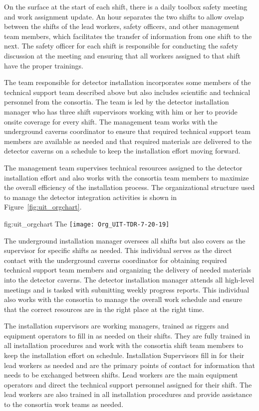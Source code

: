 On the surface at the start of each shift, there is a daily 
toolbox safety meeting and work assignment update. An hour 
separates the two shifts to allow ovelap between the shifts 
of the lead workers, safety officers, and other management 
team members, which facilitates the transfer of information 
from one shift to the next. The safety officer for each shift 
is responsible for conducting the safety discussion at the 
meeting and ensuring that all workers assigned to that shift 
have the proper trainings.

The team responsible for detector installation incorporates 
some members of the technical support team described above 
but also includes scientific and technical personnel from 
the  consortia.  The team is led by the detector 
installation manager who has three shift supervisors working 
with him or her to provide onsite coverage for every shift.
The management team works with the underground caverns 
coordinator to ensure that required technical support team 
members are available as needed and that required materials 
are delivered to the detector caverns on a schedule to keep
the installation effort moving forward.         

The management team supervises technical resources assigned to 
the detector installation effort and also works with the consortia 
team members to maximize the overall efficiency of the installation 
process.  The organizational structure used to manage the detector 
integration activities is shown in Figure~\ref{fig:uit_orgchart}.
\begin{dunefigure}{fig:uit_orgchart}
  {The }
  \texttt{[image: Org\_UIT-TDR-7-20-19]}
\end{dunefigure}

The underground installation manager oversees all shifts but also 
covers as the supervisor for specific shifts as needed.  This 
individual serves as the direct contact with the underground caverns 
coordinator for obtaining required technical support
team members and organizing the delivery of needed materials 
into the detector caverns.  The detector installation manager 
attends all high-level meetings and is tasked with submitting
weekly progress reports.  This individual also works with the 
 consortia to manage the overall work schedule 
and ensure that the correct resources are in the right place
at the right time. 
    
The installation supervisors are working managers, trained as 
riggers and equipment operators to fill in as needed on their 
shifts.  They are fully trained in all installation procedures
and work with the consortia shift team members to keep the 
installation effort on schedule.  Installation Supervisors 
fill in for their lead workers as needed and are the primary 
points of contact for information that needs to be exchanged 
between shifts.  Lead workers are the main equipment operators 
and direct the technical support personnel assigned for their 
shift.  The lead workers are also trained in all installation 
procedures and provide assistance to the consortia work teams 
as needed.  

